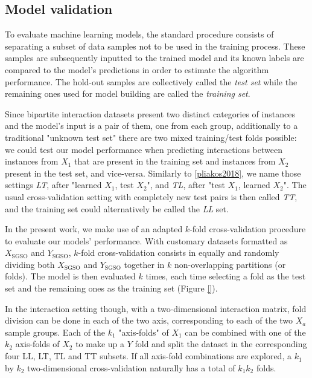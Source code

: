 
\subsection{Model validation}
\label{sec:cross_validation}

To evaluate machine learning models, the standard procedure consists of separating a subset of data samples not to be used in the training process. These samples are subsequently inputted to the trained model and its known labels are compared to the model's predictions in order to estimate the algorithm performance. The hold-out samples are collectively called the \emph{test set} while the remaining ones used for model building are called the \emph{training set}.

Since bipartite interaction datasets present two distinct categories of instances and the model's input is a pair of them, one from each group, additionally to a traditional "unknown test set" there are two mixed training/test folds possible: we could test our model performance when predicting interactions between instances from $X_1$ that are present in the training set and instances from $X_2$ present in the test set, and vice-versa. Similarly to \ref{pliakos2018}, %
we name those settings \emph{LT}, after "learned $X_1$, test $X_2$", and \emph{TL}, after "test $X_1$, learned $X_2$". The usual cross-validation setting with completely new test pairs is then called \emph{TT}, and the training set could alternatively be called the \emph{LL} set.

In the present work, we make use of an adapted $k$-fold cross-validation procedure to evaluate our models' performance. With customary datasets formatted as $X_\text{SGSO}$ and $Y_\text{SGSO}$, $k$-fold cross-validation consists in equally and randomly dividing both $X_\text{SGSO}$ and $Y_\text{SGSO}$ together in $k$ non-overlapping partitions (or folds). The model is then evaluated $k$ times, each time selecting a fold as the test set and the remaining ones as the training set (Figure \ref{}).

In the interaction setting though, with a two-dimensional interaction matrix, fold division can be done in each of the two axis, corresponding to each of the two $X_a$ sample groups. Each of the $k_1$ "axis-folds" of $X_1$ can be combined with one of the $k_2$ axis-folds of $X_2$ to make up a $Y$ fold and split the dataset in the corresponding four LL, LT, TL and TT subsets. If all axis-fold combinations are explored, a $k_1$ by $k_2$ two-dimensional cross-validation naturally has a total of $k_1k_2$ folds. 

